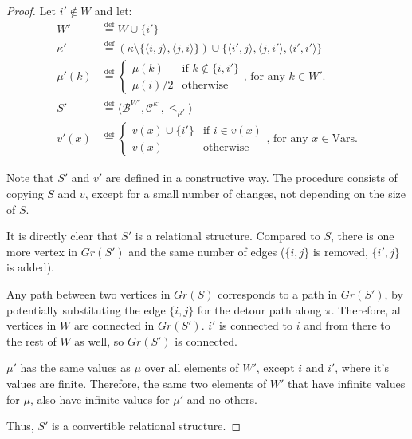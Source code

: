 \documentclass{article}
\newcommand{\B}{\mathcal{B}}
\newcommand{\Vars}{\text{Vars}}
\newcommand{\eqdef}{\stackrel{\text{def}}{=}}
\begin{document}
\begin{proof}
  Let $i' \not \in W$ and let:
\begin{align*}
W' &\eqdef W \cup \{i'\} \\
\kappa' &\eqdef (\kappa \setminus \{\langle i, j \rangle, \langle j, i \rangle\}) \cup \{\langle i', j \rangle, \langle j, i' \rangle, \langle i', i' \rangle\} \\
\mu'(k) &\eqdef \begin{cases}
\mu(k)           & \text{if $k \not \in \{i, i'\}$} \\
\mu(i) / 2       & \text{otherwise}
\end{cases}\text{, for any } k \in W'. \\
S' &\eqdef \langle \B^{W'}, \mathcal{C}^{\kappa'}, \leq_{\mu'} \rangle \\
v'(x) &\eqdef \begin{cases}
  v(x) \cup \{i'\} & \text{if } i \in v(x) \\
  v(x)             & \text{otherwise}
\end{cases}\text{, for any } x \in \Vars.
\end{align*}

Note that $S'$ and $v'$ are defined in a constructive way. The procedure consists of copying $S$ and $v$, except for a small number of changes, not depending on the size of $S$.

It is directly clear that $S'$ is a relational structure. Compared to $S$, there is one more vertex in $Gr(S')$ and the same number of edges ($\{i, j\}$ is removed, $\{i', j\}$ is added).

Any path between two vertices in $Gr(S)$ corresponds to a path in $Gr(S')$, by potentially substituting the edge $\{i, j\}$ for the detour path along $\pi$. Therefore, all vertices in $W$ are connected in $Gr(S')$. $i'$ is connected to $i$ and from there to the rest of $W$ as well, so $Gr(S')$ is connected.

$\mu'$ has the same values as $\mu$ over all elements of $W'$, except $i$ and $i'$, where it's values are finite. Therefore, the same two elements of $W'$ that have infinite values for $\mu$, also have infinite values for $\mu'$ and no others.

Thus, $S'$ is a convertible relational structure.


\end{proof}
\end{document}
